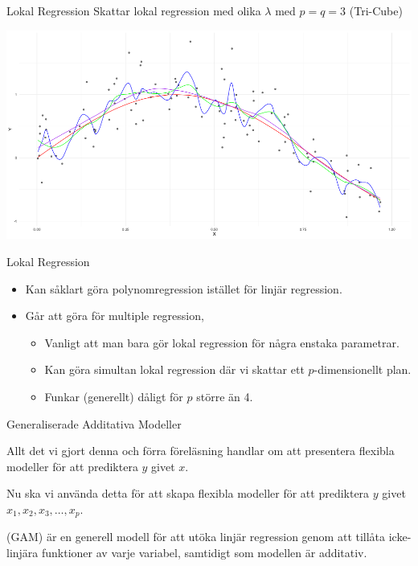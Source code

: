 \documentclass[10pt,english]{beamer}
\begin{document}
\begin{frame}{Lokal Regression}
    Skattar lokal regression med olika $\lambda$ med $p = q = 3$ (Tri-Cube)

    \includegraphics[width = \textwidth]{fig/locreg.png}
\end{frame}

\begin{frame}{Lokal Regression}
    
    \begin{itemize}
        \item Kan såklart göra polynomregression istället för linjär regression.
        \item Går att göra för multiple regression,
        \begin{itemize}
            \item Vanligt att man bara gör lokal regression för några enstaka parametrar.
            \item Kan göra simultan lokal regression där vi skattar ett $p$-dimensionellt plan.
            \item Funkar (generellt) dåligt för $p$ större än 4.
        \end{itemize}
    \end{itemize}

\end{frame}

\begin{frame}{Generaliserade Additativa Modeller}

    Allt det vi gjort denna och förra föreläsning handlar om att presentera flexibla modeller för att prediktera $y$ givet $x$.
    
    Nu ska vi använda detta för att skapa flexibla modeller för att prediktera $y$ givet $x_1, x_2, x_3, \ldots, x_p$.

    \begin{greenbox}
         (GAM) är en generell modell för att utöka linjär regression genom att tillåta icke-linjära funktioner av varje variabel, samtidigt som modellen är additativ.
    \end{greenbox}
    
\end{frame}
\end{document}
